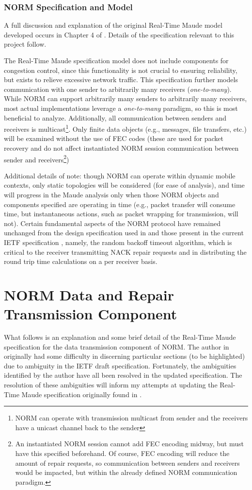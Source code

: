 \documentclass[10pt, journal]{IEEEtran}
\begin{document}
\subsubsection{NORM Specification and Model}
A full discussion and explanation of the original Real-Time Maude model developed occurs in Chapter 4 of \cite{Lien2004}. Details of the specification relevant to this project follow.

The Real-Time Maude specification model does not include components for congestion control, since this functionality is not crucial to ensuring reliability, but exists to relieve excessive network traffic. This specification further models communication with one sender to arbitrarily many receivers (\textit{one-to-many}). While NORM can support arbitrarily many senders to arbitrarily many receivers, most actual implementations leverage a \textit{one-to-many} paradigm, so this is most beneficial to analyze. Additionally, all communication between senders and receivers is multicast\footnote{NORM can operate with transmission multicast from sender and the receivers have a unicast channel back to the sender}. Only finite data objects (e.g., messages, file transfers, etc.) will be examined without the use of FEC codes (these are used for packet recovery and do not affect instantiated NORM session communication between sender and receivers\footnote{An instantiated NORM session cannot add FEC encoding midway, but must have this specified beforehand. Of course, FEC encoding will reduce the amount of repair requests, so communication between senders and receivers would be impacted, but within the already defined NORM communication paradigm.})

Additional details of note: though NORM can operate within dynamic mobile contexts, only static topologies will be considered (for ease of analysis), and time will progress in the Maude analysis only when those NORM objects and components specified are operating in time (e.g., packet transfer will consume time, but instantaneous actions, such as packet wrapping for transmission, will not). Certain fundamental aspects of the NORM protocol have remained unchanged from the design specification used in \cite{Lien2004} and those present in the current IETF specification \cite{rfc5740}, namely, the random backoff timeout algorithm, which is critical to the receiver transmitting NACK repair requests and in distributing the round trip time calculations on a per receiver basis.

\section{NORM Data and Repair Transmission Component}
What follows is an explanation and some brief detail of the Real-Time Maude specification for the data transmission component of NORM. The author in \cite{Lien2004} originally had some difficulty in discerning particular sections (to be highlighted) due to ambiguity in the IETF draft specification. Fortunately, the ambiguities identified by the author have all been resolved in the updated specification. The resolution of these ambiguities will inform my attempts at updating the Real-Time Maude specification originally found in \cite{Lien2004}.
\end{document}
